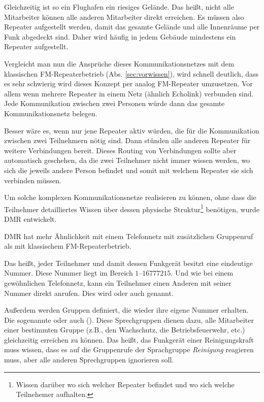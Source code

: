 Gleichzeitig ist so ein Flughafen ein riesiges Gelände. Das heißt, nicht alle Mitarbeiter können alle anderen Mitarbeiter direkt erreichen. Es müssen also Repeater aufgestellt werden, damit das gesamte Gelände und alle Innenräume per Funk abgedeckt sind. Daher wird häufig in jedem Gebäude mindestens ein Repeater aufgestellt. 

Vergleicht man nun die Ansprüche dieses Kommunikationsnetzes mit dem klassischen FM-Repeaterbetrieb (Abs. \ref{sec:vorwissen}), wird schnell deutlich, dass es sehr schwierig wird dieses Konzept per analog FM-Repeater umzusetzen. Vor allem wenn mehrere Repeater in einem Netz (ähnlich Echolink) verbunden sind. Jede Kommunikation zwischen zwei Personen würde dann das gesamte Kommunikationsnetz belegen. 

Besser wäre es, wenn nur jene Repeater aktiv würden, die für die Kommunikation zwischen zwei Teilnehmern nötig sind. Dann stünden alle anderen Repeater für weitere Verbindungen bereit. Dieses Routing von Verbindungen sollte aber automatisch geschehen, da die zwei Teilnehmer nicht immer wissen werden, wo sich die jeweils andere Person befindet und somit mit welchem Repeater sie sich verbinden müssen. 

Um solche komplexen Kommunikationsnetze realisieren zu können, ohne dass die Teilnehmer detailliertes Wissen über dessen physische Struktur\footnote{Wissen darüber wo sich welcher Repeater befindet und wo sich welche Teilnehemer aufhalten.} benötigen, wurde DMR entwickelt.

\begin{merke}
 DMR hat mehr Ähnlichkeit mit einem Telefonnetz mit zusätzlichen Gruppenruf als mit klassischem FM-Repeaterbetrieb.
\end{merke} 

Das heißt, jeder Teilnehmer und damit dessen Funkgerät besitzt eine eindeutige Nummer. Diese Nummer liegt im Bereich $1$--$16777215$. Und wie bei einem gewöhnlichen Telefonnetz, kann ein Teilnehmer einen Anderen mit seiner Nummer direkt anrufen. Dies wird  oder auch  genannt.

Außerdem werden Gruppen definiert, die wieder ihre eigene Nummer erhalten. Die sogenannte  oder auch  (). Diese Sprechgruppen dienen dazu, alle Mitarbeiter einer bestimmten Gruppe (z.B., den Wachschutz, die Betriebsfeuerwehr, etc.) gleichzeitig erreichen zu können. Das heißt, das Funkgerät einer Reinigungskraft muss wissen, dass es auf die Gruppenrufe der Sprachgruppe \emph{Reinigung} reagieren muss, aber alle anderen Sprechgruppen ignorieren soll. 

